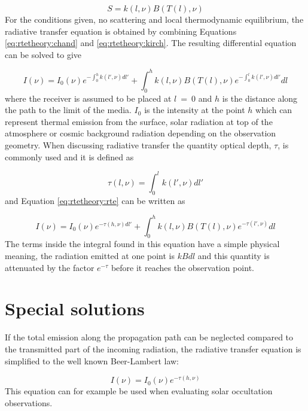  \begin{equation}
   S = k(l,\nu)B(T(l),\nu)
  \label{eq:rtetheory:kirch}
 \end{equation}  
 For the conditions given, no scattering and local thermodynamic
 equilibrium, the radiative transfer equation is obtained by combining
 Equations \ref{eq:rtetheory:chand} and \ref{eq:rtetheory:kirch}. The resulting
 differential equation can be solved to give

 \begin{equation}
   I(\nu) = I_0(\nu)e^{-\int^h_0{k(l',\nu)dl'}} + 
     \int^h_0{k(l,\nu)B(T(l),\nu) e^{-\int^l_0{k(l',\nu)dl'}} dl}
  \label{eq:rtetheory:rte}
 \end{equation}  
 where the receiver is assumed to be placed at $l$~=~0 and $h$ is the
 distance along the path to the limit of the media. $I_0$ is the
 intensity at the point $h$ which can represent thermal emission from
 the surface, solar radiation at top of the atmosphere or cosmic
 background radiation depending on the observation geometry. When
 discussing radiative transfer the quantity optical depth, $\tau$, is
 commonly used and it is defined as

 \begin{equation}
   \tau(l,\nu) = \int^l_0{k(l',\nu)dl'} 
  \label{eq:rtetheory:tau}
 \end{equation}  
 and Equation \ref{eq:rtetheory:rte} can be written as
 
 \begin{equation}
   I(\nu) = I_0(\nu)e^{-\tau(h,\nu)dl'} + 
     \int^h_0{k(l,\nu)B(T(l),\nu) e^{-\tau(l',\nu)} dl}
  \label{eq:rtetheory:rte2}
 \end{equation}  
 The terms inside the integral found in this equation have a simple
 physical meaning, the radiation emitted at one point is $kBdl$ and this
 quantity is attenuated by the factor $e^{-\tau}$ before it reaches the
 observation point.


\section{Special solutions}
 \label{sec:rtetheory:special}
 
 If the total emission along the propagation path can be neglected
 compared to the transmitted part of the incoming radiation, the
 radiative transfer equation is simplified to the well known Beer-Lambert law:
 
 \begin{equation}
   I(\nu) = I_0(\nu)e^{-\tau(h,\nu)}
  \label{eq:rtetheory:beer}
 \end{equation}  
 This equation can for example be used when evaluating solar
 occultation observations.  
 
